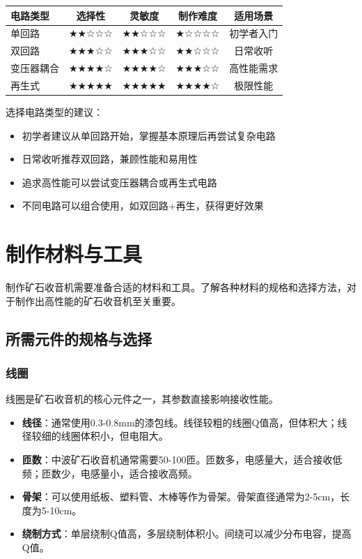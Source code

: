 \documentclass[12pt,UTF8]{ctexbook}
\begin{document}
\begin{center}
\begin{tabular}{|l|c|c|c|c|}
\hline
\textbf{电路类型} & \textbf{选择性} & \textbf{灵敏度} & \textbf{制作难度} & \textbf{适用场景} \\
\hline
单回路 & ★★☆☆☆ & ★★☆☆☆ & ★☆☆☆☆ & 初学者入门 \\
\hline
双回路 & ★★★☆☆ & ★★★☆☆ & ★★☆☆☆ & 日常收听 \\
\hline
变压器耦合 & ★★★★☆ & ★★★★☆ & ★★★☆☆ & 高性能需求 \\
\hline
再生式 & ★★★★★ & ★★★★★ & ★★★★☆ & 极限性能 \\
\hline
\end{tabular}
\end{center}

选择电路类型的建议：
\begin{itemize}[leftmargin=3.5em]
    \item 初学者建议从单回路开始，掌握基本原理后再尝试复杂电路
    \item 日常收听推荐双回路，兼顾性能和易用性
    \item 追求高性能可以尝试变压器耦合或再生式电路
    \item 不同电路可以组合使用，如双回路+再生，获得更好效果
\end{itemize}

\section{制作材料与工具}

制作矿石收音机需要准备合适的材料和工具。了解各种材料的规格和选择方法，对于制作出高性能的矿石收音机至关重要。

\subsection{所需元件的规格与选择}

\subsubsection{线圈}

线圈是矿石收音机的核心元件之一，其参数直接影响接收性能。

\begin{itemize}[leftmargin=3.5em]
    \item \textbf{线径}：通常使用0.3-0.8mm的漆包线。线径较粗的线圈Q值高，但体积大；线径较细的线圈体积小，但电阻大。
    \item \textbf{匝数}：中波矿石收音机通常需要50-100匝。匝数多，电感量大，适合接收低频；匝数少，电感量小，适合接收高频。
    \item \textbf{骨架}：可以使用纸板、塑料管、木棒等作为骨架。骨架直径通常为2-5cm，长度为5-10cm。
    \item \textbf{绕制方式}：单层绕制Q值高，多层绕制体积小。间绕可以减少分布电容，提高Q值。
\end{itemize}
\end{document}
